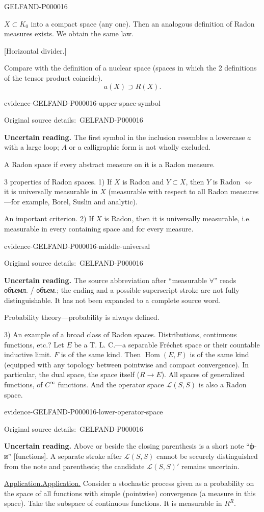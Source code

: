 \documentclass[11pt]{article}
\let\MathUnderline\underline
\renewcommand{\underline}[1]{\ifmmode\MathUnderline{#1}\else\uline{#1}\fi}
\newcommand{\SourcePage}[2]{\par\smallskip\phantomsection\label{#1:source-page}{\small\sffamily\color{blue!55!black}#1}\par\smallskip}
\newcommand{\EvidenceBlock}[4]{%
 \par\smallskip\noindent\begin{minipage}{\linewidth}
 \begin{minipage}[t]{.47\linewidth}\vspace{0pt}\centering
 \csname evidence-#1-#2\endcsname\par
 {\scriptsize\SourceCropCaption\ #1}\par
 \end{minipage}\hfill
 \begin{minipage}[t]{.49\linewidth}\vspace{0pt}\raggedright
 {\small\color{orange!65!black}\textbf{#4} #3}\par
 \end{minipage}
 \end{minipage}\par\smallskip}
\newcommand{\Unclear}[3]{\EvidenceBlock{#1}{#2}{#3}{\ReadingCaption}}
\newcommand{\SourceCropCaption}{Original source details:}\newcommand{\ReadingCaption}{Uncertain reading.}\newcommand{\IncompleteCaption}{Undeciphered passage.}\newcommand{\DiagramCaption}{Diagram and typed description.}
\begin{document}
\SourcePage{GELFAND-P000016}{unlabelled}
$X\subset K_0$ into a compact space (any one). Then an analogous definition of Radon measures exists.
We obtain the same law.

[Horizontal divider.]

Compare with the definition of a nuclear space (spaces in which the 2 definitions of the tensor product coincide).
\begin{equation*}
a(X)\supset R(X).
\end{equation*}
\Unclear{GELFAND-P000016}{upper-space-symbol}{The first symbol in the inclusion resembles a lowercase $a$ with a large loop; $A$ or a calligraphic form is not wholly excluded.}
A Radon space if every abstract measure on it is a Radon measure.

3 properties of Radon spaces.
1) If $X$ is Radon and $Y\subset X$, then $Y$ is Radon $\Longleftrightarrow$ it is universally measurable in $X$
(measurable with respect to all Radon measures---for example, Borel, Suslin and analytic).

An important criterion.
2) If $X$ is Radon, then it is universally measurable, i.e. measurable in every containing space and for every measure.
\Unclear{GELFAND-P000016}{middle-universal}{The source abbreviation after ``measurable $\forall$'' reads объемл. / объем.; the ending and a possible superscript stroke are not fully distinguishable. It has not been expanded to a complete source word.}
Probability theory---probability is always defined.

3) An example of a broad class of Radon spaces.
Distributions, continuous functions, etc.?
Let $E$ be a T. L. C.---a separable Fréchet space or their countable inductive limit.
$F$ is of the same kind.
Then $\operatorname{Hom}(E,F)$ is of the same kind (equipped with any topology between pointwise and compact convergence).
In particular, the dual space, the space itself ($R\longrightarrow E$).
All spaces of generalized functions, of $C^\infty$ functions.
And the operator space $\mathcal L(S,S)$ is also a Radon space.
\Unclear{GELFAND-P000016}{lower-operator-space}{Above or beside the closing parenthesis is a short note ``ф-и'' [functions]. A separate stroke after $\mathcal L(S,S)$ cannot be securely distinguished from the note and parenthesis; the candidate $\mathcal L(S,S)'$ remains uncertain.}

\underline{Application.} Consider a stochastic process given as a probability on the space of all functions with simple (pointwise) convergence (a measure in this space).
Take the subspace of continuous functions. It is measurable in $R^R$.
\end{document}
